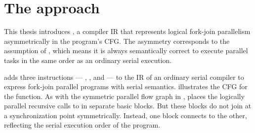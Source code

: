 \section{The \tapir approach}


This thesis introduces \tapir, a compiler IR that represents logical
fork-join parallelism asymmetrically in the program's CFG\@.  The
asymmetry corresponds to the assumption of 
\cite{FrigoLeRa98}, which means it is always semantically correct to
execute parallel tasks in the same order as an ordinary serial
execution.

\tapir adds three instructions --- \detach, \reattach, and \sync{} ---
to the IR of an ordinary serial compiler to express fork-join parallel
programs with serial semantics.   illustrates the
\tapir CFG for the  function.  As with the symmetric
parallel flow graph in , \tapir places the logically
parallel recursive calls to  in separate basic blocks.  But
these blocks do not join at a synchronization point symmetrically.
Instead, one block connects to the other, reflecting the serial
execution order of the program.

